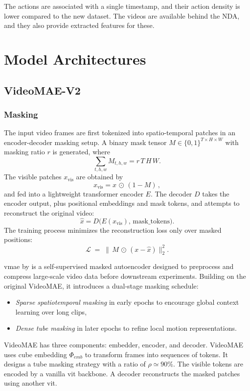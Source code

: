 The actions are associated with a single timestamp, and their action density is lower compared to the new dataset. The videos are available behind the NDA, and they also provide extracted features for these. 

\section{Model Architectures}
\label{sec:model_architectures}

\subsection{VideoMAE-V2}
\label{ssec:videomae_v2}

\subsubsection{Masking}

The input video frames are first tokenized into spatio-temporal patches in an encoder-decoder masking setup. A binary mask tensor \(M\in\{0,1\}^{T\times H\times W}\) with masking ratio \(r\) is generated, where
\[
\sum_{t,h,w} M_{t,h,w} = r\,T\,H\,W.
\]
The visible patches \(x_\text{vis}\) are obtained by
\[
x_\text{vis} = x \,\odot\,(1 - M)\,,
\]
and fed into a lightweight transformer encoder \(E\). The decoder \(D\) takes the encoder output, plus positional embeddings and mask tokens, and attempts to reconstruct the original video:
\[
\hat{x} = D\bigl(E(x_\text{vis}),\,\text{mask\_tokens}\bigr).
\]
The training process minimizes the reconstruction loss only over masked positions:
\[
\mathcal{L} \;=\; \bigl\lVert\,M \,\odot\,(x - \hat{x})\bigr\rVert_2^2.
\]


\acrfull{vmae} by \textcite{wang_videomae_2023} is a self‑supervised masked autoencoder designed to preprocess and compress large‑scale video data before downstream experiments. Building on the original VideoMAE\cite{tong_videomae_2022}, it introduces a dual‑stage masking schedule: 

\begin{itemize}
    \item \emph{Sparse spatiotemporal masking} in early epochs to encourage global context learning over long clips,
    \item \emph{Dense tube masking} in later epochs to refine local motion representations.
\end{itemize}

VideoMAE has three components: embedder, encoder, and decoder. VideoMAE uses cube embedding \(\Phi_{emb}\) to transform frames into sequences of tokens. It designs a tube masking strategy with a ratio of \(\rho \simeq 90\%\). The visible tokens are encoded by a vanilla \acrshort{vit} backbone. A decoder reconstructs the masked patches using another \acrshort{vit}\cite{wang_videomae_2023}. 


